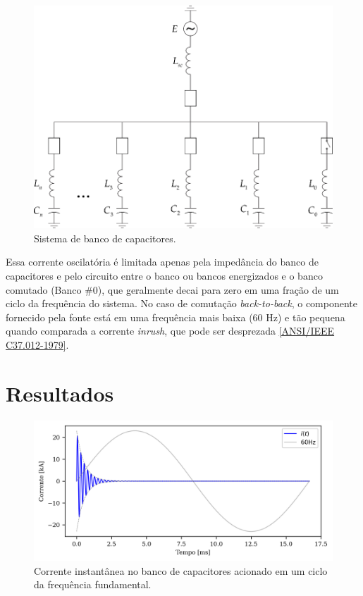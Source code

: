 \documentclass[a4paper]{article}
\begin{document}
	
\begin{figure}[!hbp]
	\centering
	\includegraphics{Picture1}
	\caption{Sistema de banco de capacitores.}
	\label{fig:picture1}
\end{figure}


Essa corrente oscilatória é limitada apenas pela impedância do banco de capacitores e pelo circuito entre o banco ou bancos energizados e o banco comutado (Banco \#0), que geralmente decai para zero em uma fração de um ciclo da frequência do sistema. No caso de comutação \textit{back-to-back}, o componente fornecido pela fonte está em uma frequência mais baixa (60 Hz) e tão pequena quando comparada a corrente \textit{inrush}, que pode ser desprezada \href{https://ieeexplore.ieee.org/document/7035261}{[ANSI/IEEE C37.012-1979]}.



\section{Resultados}
\begin{figure}[!hbp]
	\centering
	\includegraphics{Correntes.png}
	\caption{Corrente instantânea no banco de capacitores acionado em um ciclo da frequência fundamental.}
	\label{fig:picture2}
\end{figure}
\end{document}
